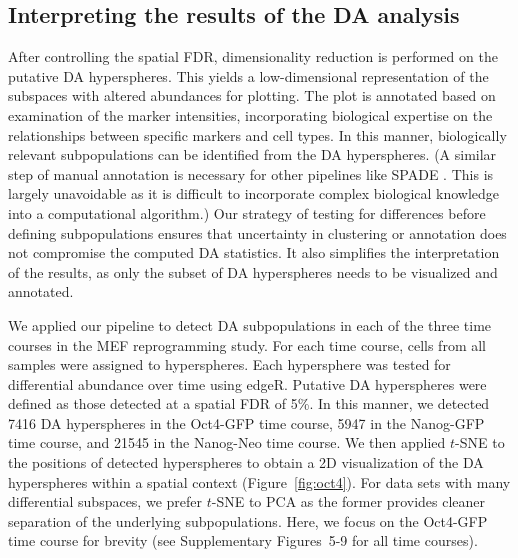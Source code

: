 \documentclass{article}
\newcommand{\suppfigrealextra}{5-9}
\begin{document}
\subsection{Interpreting the results of the DA analysis}
After controlling the spatial FDR, dimensionality reduction is performed on the putative DA hyperspheres.
This yields a low-dimensional representation of the subspaces with altered abundances for plotting.
The plot is annotated based on examination of the marker intensities, incorporating biological expertise on the relationships between specific markers and cell types.
In this manner, biologically relevant subpopulations can be identified from the DA hyperspheres.
(A similar step of manual annotation is necessary for other pipelines like SPADE \cite{anchang2016visualization}.
This is largely unavoidable as it is difficult to incorporate complex biological knowledge into a computational algorithm.)
Our strategy of testing for differences before defining subpopulations ensures that uncertainty in clustering or annotation does not compromise the computed DA statistics.
It also simplifies the interpretation of the results, as only the subset of DA hyperspheres needs to be visualized and annotated.

We applied our pipeline to detect DA subpopulations in each of the three time courses in the MEF reprogramming study.
For each time course, cells from all samples were assigned to hyperspheres.
Each hypersphere was tested for differential abundance over time using edgeR.
Putative DA hyperspheres were defined as those detected at a spatial FDR of 5\%.
In this manner, we detected 7416 DA hyperspheres in the Oct4-GFP time course, 5947 in the Nanog-GFP time course, and 21545 in the Nanog-Neo time course.
We then applied $t$-SNE \cite{van2008visualizing} to the positions of detected hyperspheres to obtain a 2D visualization of the DA hyperspheres within a spatial context (Figure~\ref{fig:oct4}).
For data sets with many differential subspaces, we prefer $t$-SNE to PCA as the former provides cleaner separation of the underlying subpopulations.
Here, we focus on the Oct4-GFP time course for brevity (see Supplementary Figures~\suppfigrealextra{} for all time courses).
\end{document}

